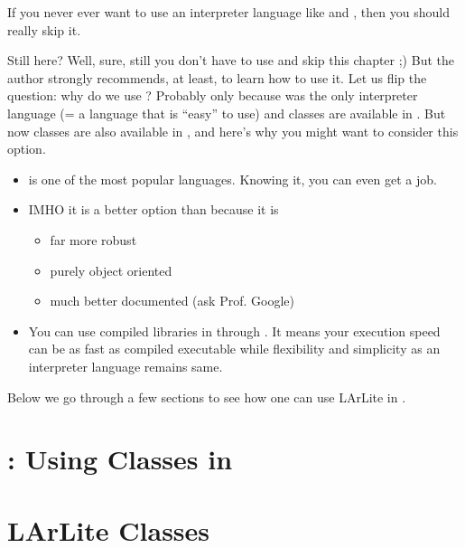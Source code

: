 If you never ever want to use an interpreter language like \python and \CINT, then 
you should really skip it.

Still here? Well, sure, still you don't have to use \python and skip this chapter ;) 
But the author strongly recommends, at least, to learn how to use it.
Let us flip the question: why do we use \CINT?
Probably only because \CINT was the only interpreter language (= a language that is ``easy'' to use) 
and \ROOT classes are available in \CINT. But now \ROOT classes are also available in \python, 
and here's why you might want to consider this option.
\begin{itemize}
\item \python is one of the most popular languages. Knowing it, you can even get a job.
\item IMHO it is a better option than \CINT because it is
      \begin{itemize}
      \item far more robust
      \item purely object oriented
      \item much better documented (ask Prof. Google)
      \end{itemize}
\item You can use compiled libraries in \python through \PyROOT. It means your execution speed can be as fast as compiled executable while flexibility and simplicity as an interpreter language remains same.
\end{itemize}
Below we go through a few sections to see how one can use LArLite in \python.

\section{}
\label{sec:python101}


\section{\PyROOT: Using \ROOT Classes in \python}
\label{sec:pyroot}


\section{LArLite Classes}
\label{sec:larlitewithpython}


